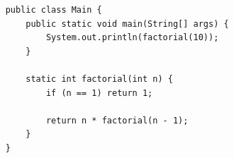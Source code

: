 \begin{listing}[htb]
  \begin{verbatim}
    public class Main {
        public static void main(String[] args) {
            System.out.println(factorial(10));
        }

        static int factorial(int n) {
            if (n == 1) return 1;

            return n * factorial(n - 1);
        }
    }
  \end{verbatim}
  \caption{Fatorial}
  \label{lst:factorial-inline-output}
\end{listing}
